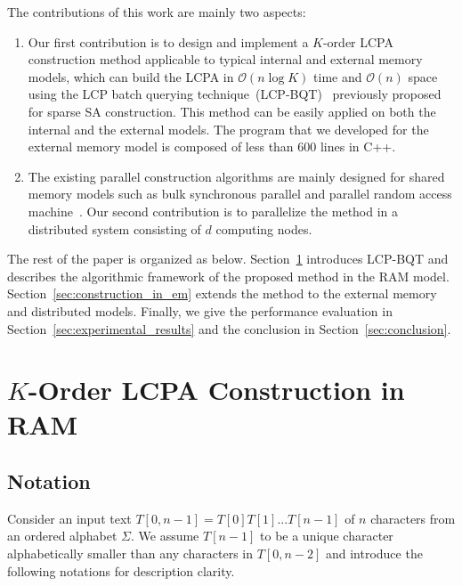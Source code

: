 \documentclass{llncs}
\begin{document}
The contributions of this work are mainly two aspects:
\begin{enumerate}
\item Our first contribution is to design and implement a $K$-order LCPA construction method applicable to typical internal and external memory models, which can build the LCPA in $\mathcal{O}(n\log K)$ time and $\mathcal{O}(n)$ space using the LCP batch querying technique~(LCP-BQT)~\cite{Philip2013} previously proposed for sparse SA construction. This method can be easily applied on both the internal and the external models. The program that we developed for the external memory model is composed of less than 600 lines in C++.
\item The existing parallel construction algorithms are mainly designed for shared memory models such as bulk synchronous parallel and parallel random access machine~\cite{Shun2014,Deo2013}. Our second contribution is to parallelize the method in a distributed system consisting of $d$ computing nodes.
\end{enumerate}

The rest of the paper is organized as below. Section~\ref{sec:construction_in_ram} introduces LCP-BQT and describes the algorithmic framework of the proposed method in the RAM model. Section~\ref{sec:construction_in_em} extends the method to the external memory and distributed models. Finally, we give the performance evaluation in Section~\ref{sec:experimental_results} and the conclusion in Section~\ref{sec:conclusion}.

\section{$K$-Order LCPA Construction in RAM}\label{sec:construction_in_ram}

\subsection{Notation}\label{subsec:basic_notations}

Consider an input text $T[0,n-1] =T[0]T[1]...T[n-1]$ of $n$ characters from an ordered alphabet $\Sigma$. We assume $T[n-1]$ to be a unique character alphabetically smaller than any characters in $T[0,n-2]$ and introduce the following notations for description clarity.
\end{document}
